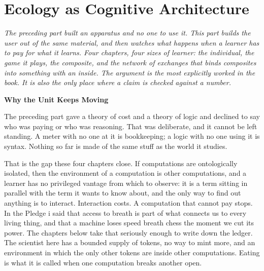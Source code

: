 \documentclass[12pt,openright,twoside]{book}
\theoremstyle{remark}
\theoremstyle{plain}
\theoremstyle{remark}
\theoremstyle{plain}
\theoremstyle{plain}
\begin{document}
\part{Ecology as Cognitive Architecture}
\label{part:ecology}

\vspace{1em}
\begin{mdframed}[backgroundcolor=remarkgray, linecolor=gray!60,
                 linewidth=1pt, topline=false, rightline=false,
                 bottomline=false]
\small\itshape
The preceding part built an apparatus and no one to use it.
This part builds the user out of the same material, and then watches what
happens when a learner has to pay for what it learns.
Four chapters, four sizes of learner: the individual, the game it plays,
the composite, and the network of exchanges that binds composites into
something with an inside.
The argument is the most explicitly worked in the book.
It is also the only place where a claim is checked against a number.
\end{mdframed}

\bigskip

{}
{\large\bfseries\color{accentblue} Why the Unit Keeps Moving}
\vspace{0.8em}

\noindent
The preceding part gave a theory of cost and a theory of logic and
declined to say who was paying or who was reasoning.
That was deliberate, and it cannot be left standing.
A meter with no one at it is bookkeeping; a logic with no one using it is
syntax.
Nothing so far is made of the same stuff as the world it studies.

That is the gap these four chapters close.
If computations are ontologically isolated, then the environment of a
computation is other computations, and a learner has no privileged
vantage from which to observe: it is a term sitting in parallel with the
term it wants to know about, and the only way to find out anything is to
interact.
Interaction costs.
A computation that cannot pay stops.
In the Pledge i said that access to breath is part of what connects us to
every living thing, and that a machine loses speed breath chess the moment
we cut its power.
The chapters below take that seriously enough to write down the ledger.
The scientist here has a bounded supply of tokens, no way to mint more, and
an environment in which the only other tokens are inside other
computations.
Eating is what it is called when one computation breaks another open.
\end{document}
